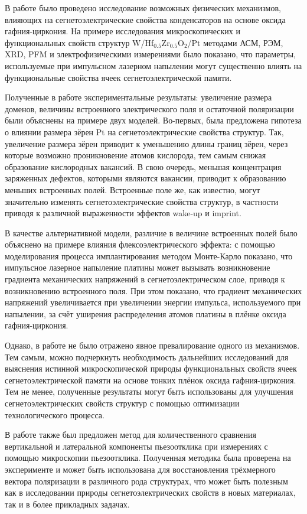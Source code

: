 В работе было проведено исследование возможных физических механизмов, влияющих на сегнетоэлектрические свойства конденсаторов на основе оксида гафния-циркония. На примере исследования микроскопических и функциональных свойств структур W/Hf\(_{0.5}\)Zr\(_{0.5}\)O\(_2\)/Pt методами АСМ, РЭМ, XRD, PFM и электрофизическими измерениями было показано, что параметры, используемые при импульсном лазерном напылении могут существенно влиять на функциональные свойства ячеек сегнетоэлектрической памяти.

Полученные в работе экспериментальные результаты: увеличение размера доменов, величины встроенного электрического поля и остаточной поляризации были объяснены на примере двух моделей. Во-первых, была предложена гипотеза о влиянии размера зёрен Pt на сегнетоэлектрические свойства структур. Так, увеличение размера зёрен приводит к уменьшению длины границ зёрен, через которые возможно проникновение атомов кислорода, тем самым снижая образование кислородных вакансий. В свою очередь, меньшая концентрация заряженных дефектов, которыми являются вакансии, приводит к образованию меньших встроенных полей. Встроенные поле же, как известно, могут значительно изменять сегнетоэлектрические свойства структур, в частности приводя к различной выраженности эффектов wake-up и imprint.

В качестве альтернативной модели, различие в величине встроенных полей было объяснено на примере влияния флексоэлектрического эффекта: с помощью моделирования процесса имплантирования методом Монте-Карло показано, что импульсное лазерное напыление платины может вызывать возникновение градиента механических напряжений в сегнетоэлектрическом слое, приводя к возникновению встроенного поля. При этом показано, что градиент механических напряжений увеличивается при увеличении энергии импульса, используемого при напылении, за счёт уширения распределения атомов платины в плёнке оксида гафния-циркония.

Однако, в работе не было отражено явное превалирование одного из механизмов. Тем самым, можно подчеркнуть необходимость дальнейших исследований для выяснения истинной микроскопической природы функциональных свойств ячеек сегнетоэлектрической памяти на основе тонких плёнок оксида гафния-циркония. Тем не менее, полученные результаты могут быть использованы для улучшения сегнетоэлектрических свойств структур с помощью оптимизации технологического процесса.

В работе также был предложен метод для количественного сравнения вертикальной и латеральной компоненты пьезоотклика при измерениях с помощью микроскопии пьезоотклика. Полученная методика была проверена на эксперименте и может быть использована для восстановления трёхмерного вектора поляризации в различного рода структурах, что может быть полезным как в исследовании природы сегнетоэлектрических свойств в новых материалах, так и в более прикладных задачах.
